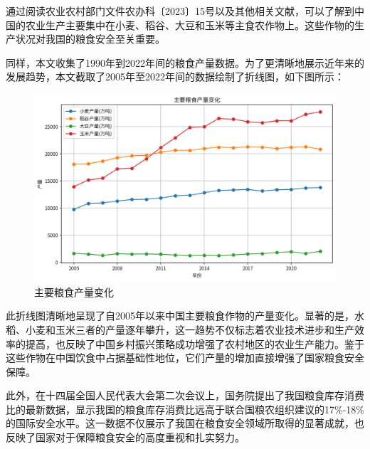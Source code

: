 通过阅读农业农村部门文件农办科〔2023〕15号以及其他相关文献，可以了解到中国的农业生产主要集中在小麦、稻谷、大豆和玉米等主食农作物上。这些作物的生产状况对我国的粮食安全至关重要。

同样，本文收集了1990年到2022年间的粮食产量数据。为了更清晰地展示近年来的发展趋势，本文截取了2005年至2022年间的数据绘制了折线图，如下图所示：

\begin{figure}[H]
    \centering    \includegraphics[width=0.9 \linewidth]{figures/8.png}
    \caption{主要粮食产量变化}   \label{fig:Changes_grain_production}
\end{figure}

此折线图清晰地呈现了自2005年以来中国主要粮食作物的产量变化。显著的是，水稻、小麦和玉米三者的产量逐年攀升，这一趋势不仅标志着农业技术进步和生产效率的提高，也反映了中国乡村振兴策略成功增强了农村地区的农业生产能力。鉴于这些作物在中国饮食中占据基础性地位，它们产量的增加直接增强了国家粮食安全保障。

此外，在十四届全国人民代表大会第二次会议上，国务院提出了我国粮食库存消费比的最新数据，显示我国的粮食库存消费比远高于联合国粮农组织建议的17\%-18\%的国际安全水平。这一数据不仅展示了我国在粮食安全领域所取得的显著成就，也反映了国家对于保障粮食安全的高度重视和扎实努力。